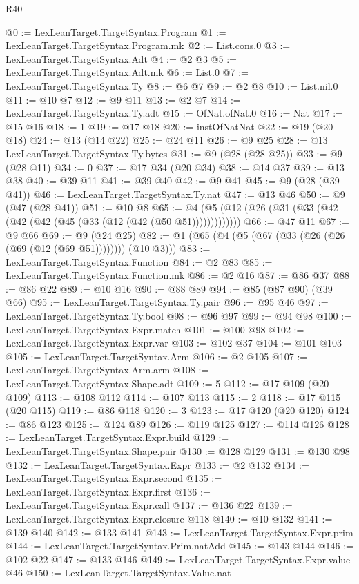 \begin{lexlean}{R40}
\begin{coremodule}
@0 := LexLeanTarget.TargetSyntax.Program
@1 := LexLeanTarget.TargetSyntax.Program.mk
@2 := List.cons.{0}
@3 := LexLeanTarget.TargetSyntax.Adt
@4 := @2 @3
@5 := LexLeanTarget.TargetSyntax.Adt.mk
@6 := List.{0}
@7 := LexLeanTarget.TargetSyntax.Ty
@8 := @6 @7
@9 := @2 @8
@10 := List.nil.{0}
@11 := @10 @7
@12 := @9 @11
@13 := @2 @7
@14 := LexLeanTarget.TargetSyntax.Ty.adt
@15 := OfNat.ofNat.{0}
@16 := Nat
@17 := @15 @16
@18 := 1
@19 := @17 @18
@20 := instOfNatNat
@22 := @19 (@20 @18)
@24 := @13 (@14 @22)
@25 := @24 @11
@26 := @9 @25
@28 := @13 LexLeanTarget.TargetSyntax.Ty.bytes
@31 := @9 (@28 (@28 @25))
@33 := @9 (@28 @11)
@34 := 0
@37 := @17 @34 (@20 @34)
@38 := @14 @37
@39 := @13 @38
@40 := @39 @11
@41 := @39 @40
@42 := @9 @41
@45 := @9 (@28 (@39 @41))
@46 := LexLeanTarget.TargetSyntax.Ty.nat
@47 := @13 @46
@50 := @9 (@47 (@28 @41))
@51 := @10 @8
@65 := @4 (@5 (@12 (@26 (@31 (@33 (@42 (@42 (@42 (@45 (@33 (@12 (@42 (@50 @51)))))))))))))
@66 := @47 @11
@67 := @9 @66
@69 := @9 (@24 @25)
@82 := @1 (@65 (@4 (@5 (@67 (@33 (@26 (@26 (@69 (@12 (@69 @51)))))))) (@10 @3)))
@83 := LexLeanTarget.TargetSyntax.Function
@84 := @2 @83
@85 := LexLeanTarget.TargetSyntax.Function.mk
@86 := @2 @16
@87 := @86 @37
@88 := @86 @22
@89 := @10 @16
@90 := @88 @89
@94 := @85 (@87 @90) (@39 @66)
@95 := LexLeanTarget.TargetSyntax.Ty.pair
@96 := @95 @46
@97 := LexLeanTarget.TargetSyntax.Ty.bool
@98 := @96 @97
@99 := @94 @98
@100 := LexLeanTarget.TargetSyntax.Expr.match
@101 := @100 @98
@102 := LexLeanTarget.TargetSyntax.Expr.var
@103 := @102 @37
@104 := @101 @103
@105 := LexLeanTarget.TargetSyntax.Arm
@106 := @2 @105
@107 := LexLeanTarget.TargetSyntax.Arm.arm
@108 := LexLeanTarget.TargetSyntax.Shape.adt
@109 := 5
@112 := @17 @109 (@20 @109)
@113 := @108 @112
@114 := @107 @113
@115 := 2
@118 := @17 @115 (@20 @115)
@119 := @86 @118
@120 := 3
@123 := @17 @120 (@20 @120)
@124 := @86 @123
@125 := @124 @89
@126 := @119 @125
@127 := @114 @126
@128 := LexLeanTarget.TargetSyntax.Expr.build
@129 := LexLeanTarget.TargetSyntax.Shape.pair
@130 := @128 @129
@131 := @130 @98
@132 := LexLeanTarget.TargetSyntax.Expr
@133 := @2 @132
@134 := LexLeanTarget.TargetSyntax.Expr.second
@135 := LexLeanTarget.TargetSyntax.Expr.first
@136 := LexLeanTarget.TargetSyntax.Expr.call
@137 := @136 @22
@139 := LexLeanTarget.TargetSyntax.Expr.closure @118
@140 := @10 @132
@141 := @139 @140
@142 := @133 @141
@143 := LexLeanTarget.TargetSyntax.Expr.prim
@144 := LexLeanTarget.TargetSyntax.Prim.natAdd
@145 := @143 @144
@146 := @102 @22
@147 := @133 @146
@149 := LexLeanTarget.TargetSyntax.Expr.value @46
@150 := LexLeanTarget.TargetSyntax.Value.nat

\end{coremodule}
\end{lexlean}
